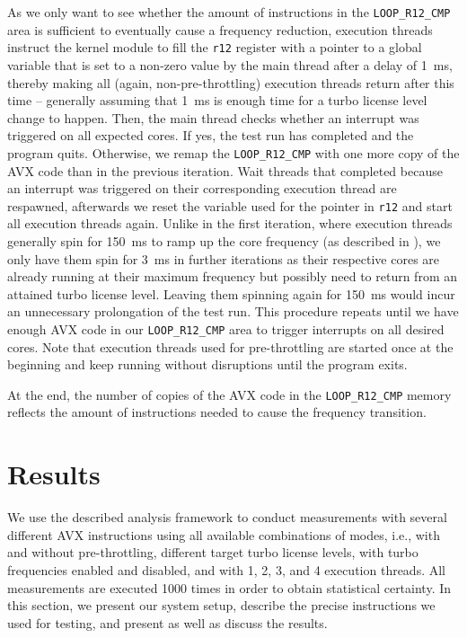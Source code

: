 As we only want to see whether the amount of instructions in the \texttt{LOOP\_R12\_CMP} area is sufficient to eventually cause a frequency reduction, execution threads instruct the kernel module to fill the \texttt{r12} register with a pointer to a global variable that is set to a non-zero value by the main thread after a delay of \SI{1}{\milli\second}, thereby making all (again, non-pre-throttling) execution threads return after this time -- generally assuming that \SI{1}{\milli\second} is enough time for a turbo license level change to happen. Then, the main thread checks whether an interrupt was triggered on all expected cores. If yes, the test run has completed and the program quits. Otherwise, we remap the \texttt{LOOP\_R12\_CMP} with one more copy of the \gls{AVX} code than in the previous iteration. Wait threads that completed because an interrupt was triggered on their corresponding execution thread are respawned, afterwards we reset the variable used for the pointer in \texttt{r12} and start all execution threads again. Unlike in the first iteration, where execution threads generally spin for \SI{150}{\milli\second} to ramp up the core frequency (as described in ), we only have them spin for \SI{3}{\milli\second} in further iterations as their respective cores are already running at their maximum frequency but possibly need to return from an attained turbo license level. Leaving them spinning again for \SI{150}{\milli\second} would incur an unnecessary prolongation of the test run. This procedure repeats until we have enough \gls{AVX} code in our \texttt{LOOP\_R12\_CMP} area to trigger interrupts on all desired cores. Note that execution threads used for pre-throttling are started once at the beginning and keep running without disruptions until the program exits.

At the end, the number of copies of the \gls{AVX} code in the \texttt{LOOP\_R12\_CMP} memory reflects the amount of instructions needed to cause the frequency transition.

\section{Results}
\label{sec:analysis:results}

We use the described analysis framework to conduct measurements with several different \gls{AVX} instructions using all available combinations of modes, i.e., with and without pre-throttling, different target turbo license levels, with turbo frequencies enabled and disabled, and with 1, 2, 3, and 4 execution threads. All measurements are executed 1000 times in order to obtain statistical certainty. In this section, we present our system setup, describe the precise instructions we used for testing, and present as well as discuss the results.

